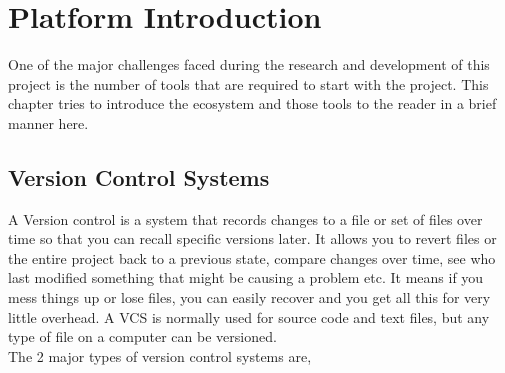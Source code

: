 \chapter{Platform Introduction}

One of the major challenges faced during the research and development
of this project is the number of tools that are required to start with
the project. This chapter tries to introduce the ecosystem and those
tools to the reader in a brief manner here.

\section{Version Control Systems}

A Version control is a system that records changes to a file or set of
files over time so that you can recall specific versions later. It
allows you to revert files or the entire project back to a previous
state, compare changes over time, see who last modified something that
might be causing a problem etc. It means if you mess things up or lose
files, you can easily recover and you get all this for very little
overhead. A VCS is normally used for source code and
text files, but any type of file on a computer can be versioned. \\


The 2 major types of version control systems are,

